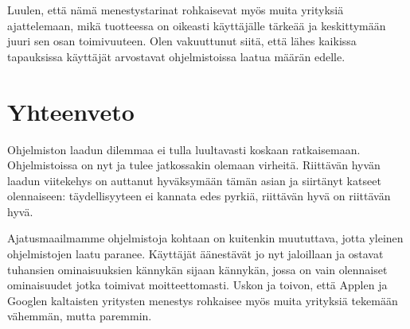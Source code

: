 \documentclass[a4paper]{article}
\begin{document}
Luulen, että nämä menestystarinat rohkaisevat myös muita yrityksiä ajattelemaan, mikä tuotteessa on oikeasti käyttäjälle tärkeää ja keskittymään juuri sen osan toimivuuteen. Olen vakuuttunut siitä, että lähes kaikissa tapauksissa käyttäjät arvostavat ohjelmistoissa laatua määrän edelle.

\section{Yhteenveto}

Ohjelmiston laadun dilemmaa ei tulla luultavasti koskaan ratkaisemaan. Ohjelmistoissa on nyt ja tulee jatkossakin olemaan virheitä. Riittävän hyvän laadun viitekehys on auttanut hyväksymään tämän asian ja siirtänyt katseet olennaiseen: täydellisyyteen ei kannata edes pyrkiä, riittävän hyvä on riittävän hyvä. 

Ajatusmaailmamme ohjelmistoja kohtaan on kuitenkin muututtava, jotta yleinen ohjelmistojen laatu paranee. Käyttäjät äänestävät jo nyt jaloillaan ja ostavat tuhansien ominaisuuksien kännykän sijaan kännykän, jossa on vain olennaiset ominaisuudet jotka toimivat moitteettomasti. Uskon ja toivon, että Applen ja Googlen kaltaisten yritysten menestys rohkaisee myös muita yrityksiä tekemään vähemmän, mutta paremmin.



\end{document}
